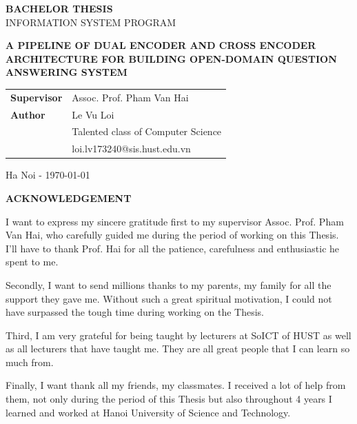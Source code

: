 \documentclass[12pt, sort&compress]{report}
\begin{document}
\begin{center}
	{\fontsize{36}{\baselineskip}\selectfont\sf\bfseries BACHELOR THESIS}\\[20pt]
	{\fontsize{24}{\baselineskip}\selectfont\sf INFORMATION SYSTEM PROGRAM}	\\[30pt]
	\begin{spacing}{1.75}
			{\fontsize{22}{\baselineskip}\selectfont\sf\bfseries A PIPELINE OF DUAL ENCODER AND CROSS ENCODER ARCHITECTURE FOR BUILDING OPEN-DOMAIN QUESTION ANSWERING SYSTEM}
	\end{spacing}
	\vspace*{1.cm}
	
	\begin{table}[!htbp]
		{\fontsize{15}{\baselineskip}\selectfont
			\begin{tabular}{T{.3\linewidth}p{.5\linewidth}}
				{\sf\bfseries Supervisor} & {\sf Assoc. Prof. Pham Van Hai} \\[10pt] 
				{\sf\bfseries Author} & {\sf Le Vu Loi} \\[4pt]
				& {\sf Talented class of Computer Science} \\[4pt]
				& {\sf loi.lv173240@sis.hust.edu.vn}
		\end{tabular}}
	\end{table}
	\vspace*{2cm}
	\begin{center}
		{\Large\sf Ha Noi - \today}
	\end{center}
\end{center}
\newpage
\tableofcontents
\listoffigures
\listoftables
\newpage
\begin{center}
	\fontsize{20}{\baselineskip}\selectfont\sf\bfseries ACKNOWLEDGEMENT
\end{center}
I want to express my sincere gratitude first to my supervisor Assoc. Prof. Pham Van Hai, who carefully guided me during the period of working on this Thesis. I'll have to thank Prof. Hai for all the patience, carefulness and enthusiastic he spent to me.
\par Secondly, I want to send millions thanks to my parents, my family for all the support they gave me. Without such a great spiritual motivation, I could not have surpassed the tough time during working on the Thesis.
\par Third, I am very grateful for being taught by lecturers at SoICT of HUST as well as all lecturers that have taught me. They are all great people that I can learn so much from.
\par Finally, I want thank all my friends, my classmates. I received a lot of help from them, not only during the period of this Thesis but also throughout 4 years I learned and worked at Hanoi University of Science and Technology.
\end{document}
